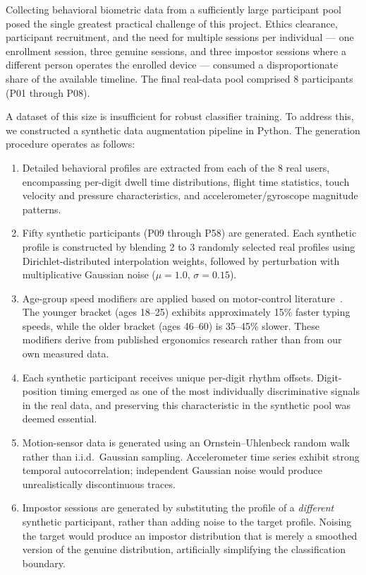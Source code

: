 \documentclass[conference]{IEEEtran}
\begin{document}
Collecting behavioral biometric data from a sufficiently large participant pool posed the single greatest practical challenge of this project. Ethics clearance, participant recruitment, and the need for multiple sessions per individual --- one enrollment session, three genuine sessions, and three impostor sessions where a different person operates the enrolled device --- consumed a disproportionate share of the available timeline. The final real-data pool comprised 8 participants (P01 through P08).

A dataset of this size is insufficient for robust classifier training. To address this, we constructed a synthetic data augmentation pipeline in Python. The generation procedure operates as follows:

\begin{enumerate}
\item Detailed behavioral profiles are extracted from each of the 8 real users, encompassing per-digit dwell time distributions, flight time statistics, touch velocity and pressure characteristics, and accelerometer/gyroscope magnitude patterns.
\item Fifty synthetic participants (P09 through P58) are generated. Each synthetic profile is constructed by blending 2 to 3 randomly selected real profiles using Dirichlet-distributed interpolation weights, followed by perturbation with multiplicative Gaussian noise ($\mu = 1.0$, $\sigma = 0.15$).
\item Age-group speed modifiers are applied based on motor-control literature~\cite{ketcham2002aging}. The younger bracket (ages 18--25) exhibits approximately 15\% faster typing speeds, while the older bracket (ages 46--60) is 35--45\% slower. These modifiers derive from published ergonomics research rather than from our own measured data.
\item Each synthetic participant receives unique per-digit rhythm offsets. Digit-position timing emerged as one of the most individually discriminative signals in the real data, and preserving this characteristic in the synthetic pool was deemed essential.
\item Motion-sensor data is generated using an Ornstein--Uhlenbeck random walk rather than i.i.d.\ Gaussian sampling. Accelerometer time series exhibit strong temporal autocorrelation; independent Gaussian noise would produce unrealistically discontinuous traces.
\item Impostor sessions are generated by substituting the profile of a \emph{different} synthetic participant, rather than adding noise to the target profile. Noising the target would produce an impostor distribution that is merely a smoothed version of the genuine distribution, artificially simplifying the classification boundary.
\end{enumerate}
\end{document}
